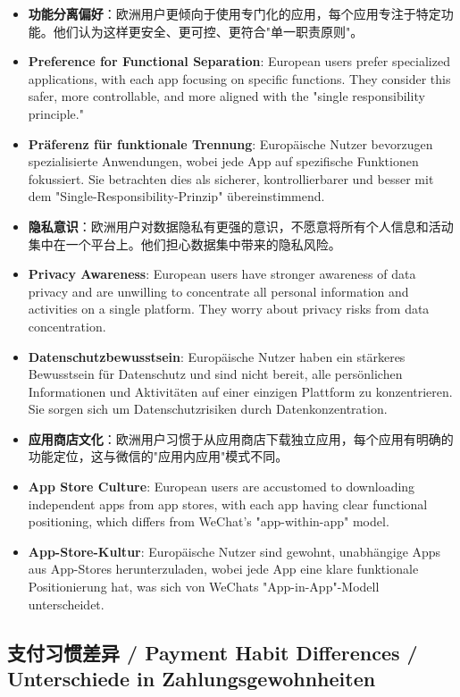 \documentclass[11pt,a4paper]{article}
\begin{document}
\begin{itemize}
    \item \textbf{功能分离偏好}：欧洲用户更倾向于使用专门化的应用，每个应用专注于特定功能。他们认为这样更安全、更可控、更符合"单一职责原则"。
    \item \textbf{Preference for Functional Separation}: European users prefer specialized applications, with each app focusing on specific functions. They consider this safer, more controllable, and more aligned with the "single responsibility principle."
    \item \textbf{Präferenz für funktionale Trennung}: Europäische Nutzer bevorzugen spezialisierte Anwendungen, wobei jede App auf spezifische Funktionen fokussiert. Sie betrachten dies als sicherer, kontrollierbarer und besser mit dem "Single-Responsibility-Prinzip" übereinstimmend.
    
    \item \textbf{隐私意识}：欧洲用户对数据隐私有更强的意识，不愿意将所有个人信息和活动集中在一个平台上。他们担心数据集中带来的隐私风险。
    \item \textbf{Privacy Awareness}: European users have stronger awareness of data privacy and are unwilling to concentrate all personal information and activities on a single platform. They worry about privacy risks from data concentration.
    \item \textbf{Datenschutzbewusstsein}: Europäische Nutzer haben ein stärkeres Bewusstsein für Datenschutz und sind nicht bereit, alle persönlichen Informationen und Aktivitäten auf einer einzigen Plattform zu konzentrieren. Sie sorgen sich um Datenschutzrisiken durch Datenkonzentration.
    
    \item \textbf{应用商店文化}：欧洲用户习惯于从应用商店下载独立应用，每个应用有明确的功能定位，这与微信的"应用内应用"模式不同。
    \item \textbf{App Store Culture}: European users are accustomed to downloading independent apps from app stores, with each app having clear functional positioning, which differs from WeChat's "app-within-app" model.
    \item \textbf{App-Store-Kultur}: Europäische Nutzer sind gewohnt, unabhängige Apps aus App-Stores herunterzuladen, wobei jede App eine klare funktionale Positionierung hat, was sich von WeChats "App-in-App"-Modell unterscheidet.
\end{itemize}

\subsection{支付习惯差异 / Payment Habit Differences / Unterschiede in Zahlungsgewohnheiten}
\end{document}
